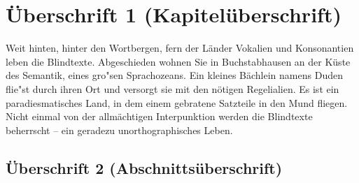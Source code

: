 \documentclass[11pt, rgb]{scrreprt}
\begin{document}
\listoftables
{}




%
%
%
%



\rmfamily %
\normalsize

\chapter{Überschrift 1 (Kapitelüberschrift)}

Weit hinten, hinter den Wortbergen, fern der Länder Vokalien und Konsonantien leben die Blindtexte. Abgeschieden wohnen Sie in Buchstabhausen an der Küste des Semantik, eines gro"sen Sprachozeans. Ein kleines Bächlein namens Duden flie"st durch ihren Ort und versorgt sie mit den nötigen Regelialien. Es ist ein paradiesmatisches Land, in dem einem gebratene Satzteile in den Mund fliegen. Nicht einmal von der allmächtigen Interpunktion werden die Blindtexte beherrscht – ein geradezu unorthographisches Leben.

\section{Überschrift 2 (Abschnittsüberschrift)}
\end{document}
